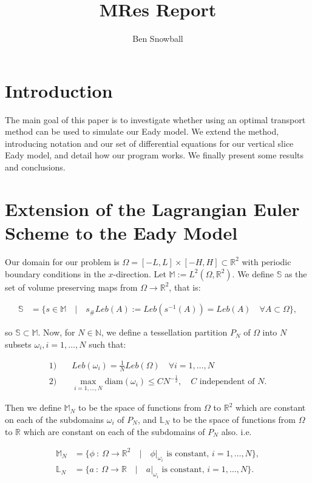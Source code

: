 \documentclass[11pt, oneside]{article}   	%
\title{MRes Report}
\author{Ben Snowball}
\newcommand{\R}{\mathbb{R}}
\newcommand{\MN}{\mathbb{M}_N}
\newcommand{\LN}{\mathbb{L}_N}
\newcommand{\M}{\mathbb{M}}
\newcommand{\N}{\mathbb{N}}
\begin{document}
\maketitle
\section{Introduction}

The main goal of this paper is to investigate whether using an optimal transport method can be used to simulate our Eady model. We extend the method, introducing notation and our set of differential equations for our vertical slice Eady model, and detail how our program works. We finally present some results and conclusions.


\section{Extension of the Lagrangian Euler Scheme to the Eady Model}

Our domain for our problem is \(\Omega = [-L, L] \times [-H, H] \subset \R^2\) with periodic boundary conditions in the \(x\)-direction. Let \(\M := L^2(\Omega, \R^2)\). We define \(\mathbb{S}\) as the set of volume preserving maps from \(\Omega \to \R^2\), that is:

\begin{align}
\mathbb{S} &= \{ s \in \M \quad | \quad s_{\#}Leb(A) := Leb(s^{-1}(A)) = Leb(A) \quad \forall A \subset \Omega \},
\end{align}

so \(\mathbb{S} \subset \M\). Now, for \(N \in \N\), we define a tessellation partition \(P_N\) of \(\Omega\) into \(N\) subsets \(\omega_i, i=1,\dots,N\) such that:

\begin{align}
1)& \quad Leb(\omega_i) = \frac{1}{N}Leb(\Omega) \quad \forall i = 1,\dots,N \\
2)& \quad \max_{i = 1,\dots,N} \mathrm{diam}(\omega_i) \le CN^{-\frac{1}{2}}, \quad C \text{ independent of } N.
\end{align}

Then we define \(\MN\) to be the space of functions from \(\Omega\) to \(\R^2\) which are constant on each of the subdomains \(\omega_i\) of \(P_N\), and \(\LN\) to be the space of functions from  \(\Omega\) to \(\R\) which are constant on each of the subdomains of \(P_N\) also. i.e.

\begin{align}
\MN &= \{ \phi \: : \: \Omega \to \R^2 \quad | \quad \phi | _{\omega_i} \text{ is constant, } i = 1,\dots,N\}, \\
\LN &= \{ a \: : \: \Omega \to \R \quad | \quad a | _{\omega_i} \text{ is constant, } i = 1,\dots,N\}.
\end{align}
\end{document}
